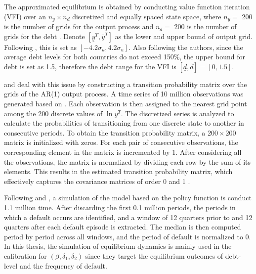 The approximated equilibrium is obtained by conducting value function iteration (VFI) over an $n_y \times n_d$ discretized and equally spaced state space,
where $n_y = $ 200 is the number of grids for the output process and $n_d=$ 200 is the number of grids for the debt \citep{Na-18}. Denote $[\underline{y}^T, \overline{y}^T]$ as the lower and upper bound of output grid. Following \citet{Uribe-Schmitt-Grohe-textbook}, this is set as $[-4.2 \sigma_u, 4.2 \sigma_u]$. Also following the authors, since the average debt levels for both countries do not exceed 150\%, the upper bound for debt is set as 1.5, therefore the debt range for the VFI is $[\underline{d}, \overline{d}]=[0,1.5]$.

\citet{Schmitt-Uribe-16} and \citet{Na-18} deal with this issue by constructing a transition probability matrix over the grids of the AR(1) output process.
A time series of 10 million observations was generated based on . Each observation is then assigned to the nearest grid point among the 200 discrete values of $\ln y^T$. The discretized series is analyzed to calculate the probabilities of transitioning from one discrete state to another in consecutive periods.
To obtain the transition probability matrix, a $200\times200$ matrix is initialized with zeros. For each pair of consecutive observations, the corresponding element in the matrix is incremented by 1. After considering all the observations, the matrix is normalized by dividing each row by the sum of its elements. This results in the estimated transition probability matrix, which effectively captures the covariance matrices of order 0 and 1
\citep*{Uribe-Schmitt-Grohe-textbook}.

Following \citet{Schmitt-Uribe-16}
and \citet{Na-18}, a simulation of the model based on the policy function is conduct 1.1 million time. After discarding the first 0.1 million periods, the periods in which a default occurs are identified, and a window of 12 quarters prior to and 12 quarters after each default episode is extracted. The median is then computed period by period across all windows, and the period of default is normalized to 0. In this thesis, the simulation of equilibrium dynamics is mainly used in the calibration for $(\beta, \delta_1, \delta_2)$ since they target the equilibrium outcomes of debt-level and the frequency of default.